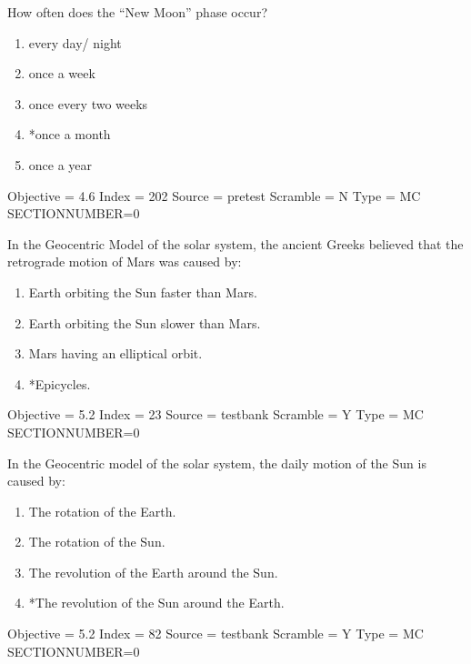 \documentclass[11pt]{article}
\begin{document}
\begin{enumerate}
\begin{minipage}{\textwidth}
\begin{minipage}{\textwidth}
\item How often does the “New Moon” phase occur?
\begin{multicols}{2}
\begin{enumerate} 
\setlength{\itemsep}{1pt} 
\setlength{\parskip}{0pt} 
\setlength{\parsep}{0pt}
\setlength{\multicolsep}{1pt} 
\item every day/ night
\item once a week
\item once every two weeks
\item *once a month
\item once a year
\end{enumerate} 
\vfill 
\end{multicols}

Objective = 4.6
Index = 202
Source = pretest
Scramble = N
Type = MC
SECTIONNUMBER=0
\end{minipage}
\end{minipage}
\vskip 0.20in

\begin{minipage}{\textwidth}
\begin{minipage}{\textwidth}
\item In the Geocentric Model of the solar system, the ancient Greeks believed that the retrograde motion of Mars was caused by:
\begin{enumerate} 
\setlength{\itemsep}{1pt} 
\setlength{\parskip}{0pt} 
\setlength{\parsep}{0pt}
\setlength{\multicolsep}{1pt} 
\item Earth orbiting the Sun faster than Mars.
\item Earth orbiting the Sun slower than Mars.
\item Mars having an elliptical orbit.
\item *Epicycles.
\end{enumerate} 
Objective = 5.2
Index = 23
Source = testbank
Scramble = Y
Type = MC
SECTIONNUMBER=0
\end{minipage}
\end{minipage}
\vskip 0.20in

\begin{minipage}{\textwidth}
\begin{minipage}{\textwidth}
\item In the Geocentric model of the solar system, the daily motion of the Sun is caused by:
\begin{enumerate} 
\setlength{\itemsep}{1pt} 
\setlength{\parskip}{0pt} 
\setlength{\parsep}{0pt}
\setlength{\multicolsep}{1pt} 
\item The rotation of the Earth.
\item The rotation of the Sun.
\item The revolution of the Earth around the Sun.
\item *The revolution of the Sun around the Earth.
\end{enumerate} 
Objective = 5.2
Index = 82
Source = testbank
Scramble = Y
Type = MC
SECTIONNUMBER=0
\end{minipage}
\end{minipage}
\vskip 0.20in


\end{enumerate}
\end{document}
